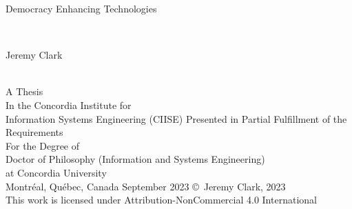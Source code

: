 
\thispagestyle{empty} %

\begin{center} 

\begin{Large} Democracy Enhancing Technologies \end{Large}\\[3em]
\begin{large} Jeremy Clark \end{large}\\
\vfill
A Thesis\\
In the Concordia Institute for 
\\ Information Systems Engineering (CIISE)
\vfill
Presented in Partial Fulfillment of the Requirements\\
For the Degree of\\
Doctor of Philosophy (Information and Systems Engineering)\\
at Concordia University\\
Montr\'{e}al, Qu\'{e}bec, Canada
\vfill
September 2023
\vfill
\copyright~Jeremy Clark, 2023\\
This work is licensed under Attribution-NonCommercial 4.0 International





\end{center}



